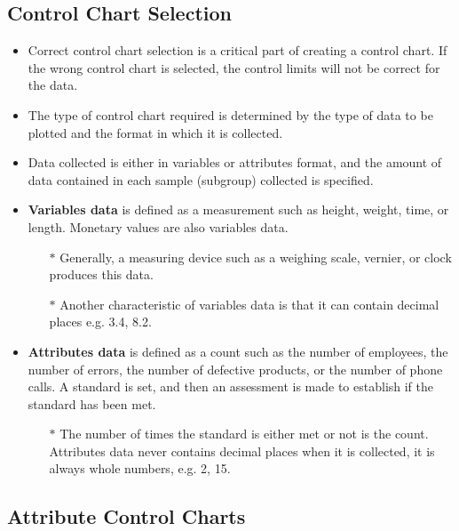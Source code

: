 \documentclass[]{report}
\begin{document}
\subsection{Control Chart Selection}
\begin{itemize}
	\item Correct control chart selection is a critical part of creating a control chart. If the wrong control chart is selected, the control limits will not be correct for the data. 
	\item The type of control chart required is determined by the type of data to be plotted and the format in which it is collected. \item Data collected is either in variables or attributes format, and the amount of data contained in each sample (subgroup) collected is specified.
	
	\item \textbf{Variables data} is defined as a measurement such as height, weight, time, or length. Monetary values are also variables data. 
	\begin{itemize}
		\item[$\ast$] Generally, a measuring device such as a weighing scale, vernier, or clock produces this data. \item[$\ast$] Another characteristic of variables data is that it can contain decimal places e.g. 3.4, 8.2.
	\end{itemize}
	
	\item \textbf{Attributes data} is defined as a count such as the number of employees, the number of errors, the number of defective products, or the number of phone calls. A standard is set, and then an assessment is made to establish if the standard has been met. 
	\begin{itemize}
		\item[$\ast$] The number of times the standard is either met or not is the count. Attributes data never contains decimal places when it is collected, it is always whole numbers, e.g. 2, 15.
	\end{itemize}
\end{itemize}

\newpage

\subsection{Attribute Control Charts}
\end{document}
